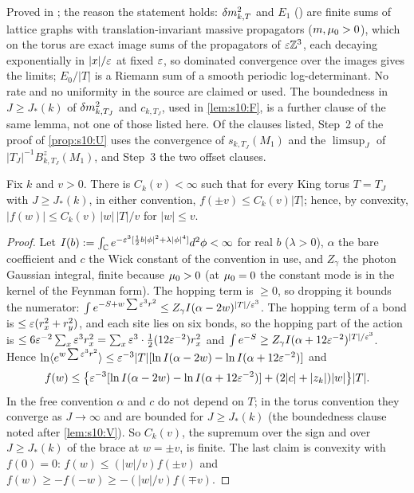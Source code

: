 Proved in ; the reason the statement holds: $\delta m^2_{k,T}$ and $E_1$ (\cite[(3.32)--(3.33), (3.35)]{K1}) are finite sums of lattice graphs with translation-invariant massive propagators ($m,\mu_0>0$), which on the torus are exact image sums of the propagators of $\varepsilon\mathbb Z^3$, each decaying exponentially in $|x|/\varepsilon$ at fixed $\varepsilon$, so dominated convergence over the images gives the limits; $E_0/|T|$ is a Riemann sum of a smooth periodic log-determinant. No rate and no uniformity in the source are claimed or used. The boundedness in $J\ge J_*(k)$ of $\delta m^2_{k,T_J}$ and $c_{k,T_J}$, used in \cref{lem:s10:F}, is a further clause of the same lemma, not one of those listed here. Of the clauses listed, Step~2 of the proof of \cref{prop:s10:U} uses the convergence of $s_{k,T_J}(M_1)$ and the $\limsup_J$ of $|T_J|^{-1}B^z_{k,T_J}(M_1)$, and Step~3 the two offset clauses.

\begin{lemma}\label{lem:s10:F}
Fix $k$ and $v>0$. There is $C_k(v)<\infty$ such that for every King torus $T=T_J$ with $J\ge J_*(k)$, in either convention, $f(\pm v)\le C_k(v)|T|$; hence, by convexity, $|f(w)|\le C_k(v)\,|w|\,|T|/v$ for $|w|\le v$.
\end{lemma}

\begin{proof}
Let $I(b):=\int_{\mathbb C} e^{-\varepsilon^3[\frac12b|\phi|^2+\lambda|\phi|^4]}d^2\phi<\infty$ for real $b$ ($\lambda>0$), $\alpha$ the bare coefficient and $c$ the Wick constant of the convention in use, and $Z_\gamma$ the photon Gaussian integral, finite because $\mu_0>0$ (at $\mu_0=0$ the constant mode is in the kernel of the Feynman form). The hopping term is $\ge0$, so dropping it bounds the numerator: $\int e^{-S+w\sum\varepsilon^3r^2}\le Z_\gamma I(\alpha-2w)^{|T|/\varepsilon^3}$. The hopping term of a bond is $\le\varepsilon(r_x^2+r_y^2)$, and each site lies on six bonds, so the hopping part of the action is $\le6\varepsilon^{-2}\sum_x\varepsilon^3r_x^2=\sum_x\varepsilon^3\cdot\frac12(12\varepsilon^{-2})r_x^2$ and $\int e^{-S}\ge Z_\gamma I(\alpha+12\varepsilon^{-2})^{|T|/\varepsilon^3}$. Hence $\ln\langle e^{w\sum\varepsilon^3r^2}\rangle\le\varepsilon^{-3}|T|[\ln I(\alpha-2w)-\ln I(\alpha+12\varepsilon^{-2})]$ and
\[
f(w)\le\big\{\varepsilon^{-3}[\ln I(\alpha-2w)-\ln I(\alpha+12\varepsilon^{-2})]+(2|c|+|z_k|)|w|\big\}|T| .
\]
In the free convention $\alpha$ and $c$ do not depend on $T$; in the torus convention they converge as $J\to\infty$ and are bounded for $J\ge J_*(k)$ (the boundedness clause noted after \cref{lem:s10:V}). So $C_k(v)$, the supremum over the sign and over $J\ge J_*(k)$ of the brace at $w=\pm v$, is finite. The last claim is convexity with $f(0)=0$: $f(w)\le(|w|/v)f(\pm v)$ and $f(w)\ge-f(-w)\ge-(|w|/v)f(\mp v)$.
\end{proof}

